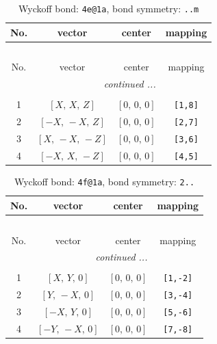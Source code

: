 \documentclass[fleqn,8pt]{jsarticle}
\begin{document}
\renewcommand{\arraystretch}{1.2}
\begin{longtable}{cccc}
\caption{Wyckoff bond: {\tt 4e@1a}, bond symmetry: {\tt ..m}}
 \\
 \hline \hline
No. & vector & center & mapping \\ \hline \endfirsthead

\multicolumn{3}{l}{\tablename\ \thetable{}} \\
 \hline \hline
No. & vector & center & mapping \\ \hline \endhead

 \hline \hline
\multicolumn{3}{r}{\footnotesize\it continued ...} \\ \endfoot

 \hline \hline
\multicolumn{3}{r}{} \\ \endlastfoot

1 & $\left[ X,\, X,\, Z \right]$ & $\left[ 0,\, 0,\, 0 \right]$ & {\tt [1,8]} \\ \hline
2 & $\left[ - X,\, - X,\, Z \right]$ & $\left[ 0,\, 0,\, 0 \right]$ & {\tt [2,7]} \\ \hline
3 & $\left[ X,\, - X,\, - Z \right]$ & $\left[ 0,\, 0,\, 0 \right]$ & {\tt [3,6]} \\ \hline
4 & $\left[ - X,\, X,\, - Z \right]$ & $\left[ 0,\, 0,\, 0 \right]$ & {\tt [4,5]} \\
\end{longtable}
\renewcommand{\arraystretch}{1.2}
\begin{longtable}{cccc}
\caption{Wyckoff bond: {\tt 4f@1a}, bond symmetry: {\tt 2..}}
 \\
 \hline \hline
No. & vector & center & mapping \\ \hline \endfirsthead

\multicolumn{3}{l}{\tablename\ \thetable{}} \\
 \hline \hline
No. & vector & center & mapping \\ \hline \endhead

 \hline \hline
\multicolumn{3}{r}{\footnotesize\it continued ...} \\ \endfoot

 \hline \hline
\multicolumn{3}{r}{} \\ \endlastfoot

1 & $\left[ X,\, Y,\, 0 \right]$ & $\left[ 0,\, 0,\, 0 \right]$ & {\tt [1,-2]} \\ \hline
2 & $\left[ Y,\, - X,\, 0 \right]$ & $\left[ 0,\, 0,\, 0 \right]$ & {\tt [3,-4]} \\ \hline
3 & $\left[ - X,\, Y,\, 0 \right]$ & $\left[ 0,\, 0,\, 0 \right]$ & {\tt [5,-6]} \\ \hline
4 & $\left[ - Y,\, - X,\, 0 \right]$ & $\left[ 0,\, 0,\, 0 \right]$ & {\tt [7,-8]} \\
\end{longtable}
\end{document}
